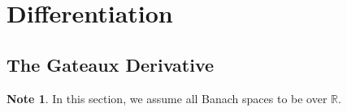 \documentclass[12pt]{amsart}
\theoremstyle{definition}
\newtheorem{defn}[definition]{Definition}
\newtheorem{note}[definition]{Note}
\newcommand{\del}{\delta}
\newcommand{\N}{\mathbb{N}}
\newcommand{\R}{\mathbb{R}}
\begin{document}
%
%


	
	
	
	
	
	
	
	
	
	
	
	
	
	\newpage
	\section{Differentiation}
	
	\subsection{The Gateaux Derivative}
	
	\begin{note}
	In this section, we assume all Banach spaces to be over $\R$. 
	\end{note}
	
\end{document}
